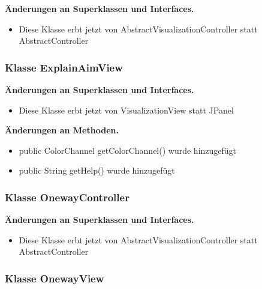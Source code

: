 \documentclass{article}
\begin{document}
	    \textbf{Änderungen an Superklassen und Interfaces.}\newline
	   \begin{itemize}
            \item Diese Klasse erbt jetzt von AbstractVisualizationController statt AbstractController\newline
           \end{itemize}

	\subsubsection{Klasse ExplainAimView}

	    \textbf{Änderungen an Superklassen und Interfaces.}\newline
	   \begin{itemize}
            \item Diese Klasse erbt jetzt von VisualizationView statt JPanel\newline
           \end{itemize}

    \textbf{Änderungen an Methoden.}\newline
	   \begin{itemize}
           \item public ColorChannel getColorChannel() wurde hinzugefügt\newline
           \item public String getHelp() wurde hinzugefügt\newline
           \end{itemize}

	\subsubsection{Klasse OnewayController}

	    \textbf{Änderungen an Superklassen und Interfaces.}\newline
	   \begin{itemize}
            \item Diese Klasse erbt jetzt von AbstractVisualizationController statt AbstractController\newline
           \end{itemize}

	\subsubsection{Klasse OnewayView}
\end{document}
